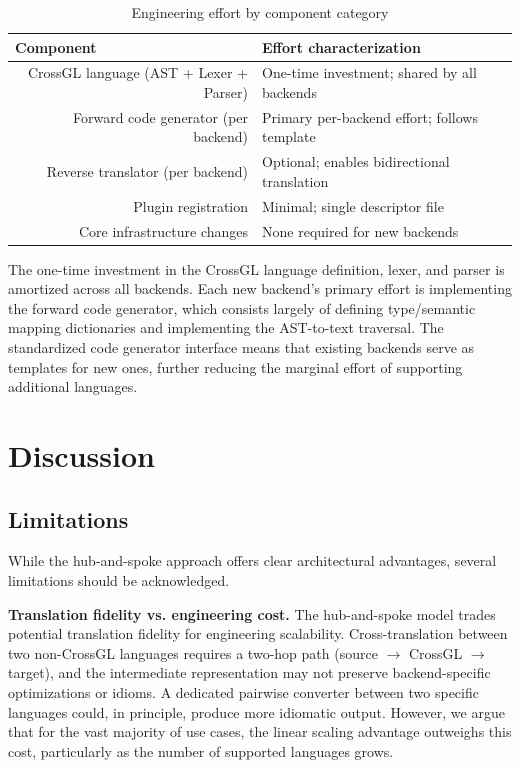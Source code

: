 \documentclass{svproc}
\begin{document}
\begin{table}
\caption{Engineering effort by component category}
\label{tab:effort}
\begin{center}
\begin{tabular}{r@{\quad}l}
\hline
\multicolumn{1}{l}{\rule{0pt}{12pt}\textbf{Component}} & \textbf{Effort characterization} \\[2pt]
\hline\rule{0pt}{12pt}
CrossGL language (AST + Lexer + Parser) & One-time investment; shared by all backends \\
Forward code generator (per backend) & Primary per-backend effort; follows template \\
Reverse translator (per backend) & Optional; enables bidirectional translation \\
Plugin registration & Minimal; single descriptor file \\
Core infrastructure changes & None required for new backends \\[2pt]
\hline
\end{tabular}
\end{center}
\end{table}

The one-time investment in the CrossGL language definition, lexer, and parser is amortized across all backends. Each new backend's primary effort is implementing the forward code generator, which consists largely of defining type/semantic mapping dictionaries and implementing the AST-to-text traversal. The standardized code generator interface means that existing backends serve as templates for new ones, further reducing the marginal effort of supporting additional languages.
\section{Discussion}

\subsection{Limitations}

While the hub-and-spoke approach offers clear architectural advantages, several limitations should be acknowledged.

\textbf{Translation fidelity vs. engineering cost.} The hub-and-spoke model trades potential translation fidelity for engineering scalability. Cross-translation between two non-CrossGL languages requires a two-hop path (source $\rightarrow$ CrossGL $\rightarrow$ target), and the intermediate representation may not preserve backend-specific optimizations or idioms. A dedicated pairwise converter between two specific languages could, in principle, produce more idiomatic output. However, we argue that for the vast majority of use cases, the linear scaling advantage outweighs this cost, particularly as the number of supported languages grows.
\end{document}
